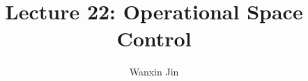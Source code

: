 \documentclass[10pt]{article}
\begin{document}
\title{Lecture 22: Operational Space Control}
\author{Wanxin Jin}
\maketitle






\end{document}
